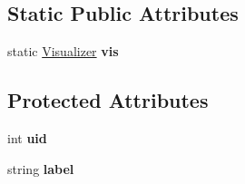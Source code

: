 \subsection*{Static Public Attributes}
\begin{DoxyCompactItemize}
\item 
\hypertarget{classAST_aca9e6637209b31e03a09c0d42f29bdfa}{static \hyperlink{classVisualizer}{Visualizer} {\bfseries vis}}\label{classAST_aca9e6637209b31e03a09c0d42f29bdfa}

\end{DoxyCompactItemize}
\subsection*{Protected Attributes}
\begin{DoxyCompactItemize}
\item 
\hypertarget{classAST_a847b778f1c3dd5a19de32de432ee6e15}{int {\bfseries uid}}\label{classAST_a847b778f1c3dd5a19de32de432ee6e15}

\item 
\hypertarget{classAST_ab2e239ccc0688d2341724432ff5a1a31}{string {\bfseries label}}\label{classAST_ab2e239ccc0688d2341724432ff5a1a31}

\end{DoxyCompactItemize}
